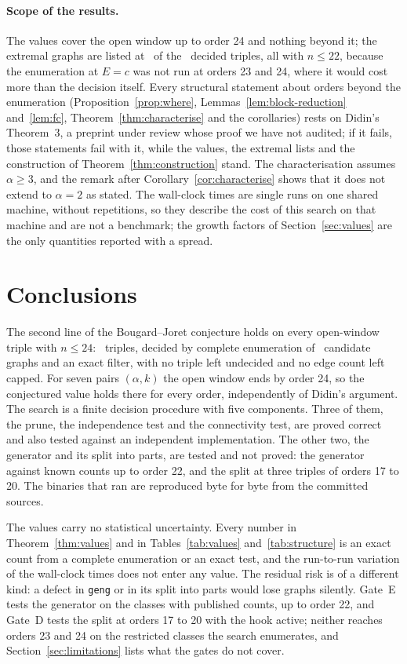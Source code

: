 \documentclass[11pt]{article}
\theoremstyle{definition}
\theoremstyle{remark}
\begin{document}
\paragraph{Scope of the results.} The values cover the open window up to order 24 and nothing beyond it; the
extremal graphs are listed at \nexttriples\ of the \ntriples\ decided triples, all with $n\le22$, because the
enumeration at $E=c$ was not run at orders 23 and 24, where it would cost more than the decision itself. Every
structural statement about orders beyond the enumeration (Proposition~\ref{prop:where}, Lemmas~\ref{lem:block-reduction}
and~\ref{lem:fc}, Theorem~\ref{thm:characterise} and the corollaries) rests on Didin's Theorem~3, a preprint under
review whose proof we have not audited; if it fails, those statements fail with it, while the values, the extremal
lists and the construction of Theorem~\ref{thm:construction} stand. The characterisation assumes $\alpha\ge3$, and the
remark after Corollary~\ref{cor:characterise} shows that it does not extend to $\alpha=2$ as stated. The wall-clock
times are single runs on one shared machine, without repetitions, so they describe the cost of this search on that
machine and are not a benchmark; the growth factors of Section~\ref{sec:values} are the only quantities reported with a
spread.

\section{Conclusions}\label{sec:conclusions}

The second line of the Bougard--Joret conjecture holds on every open-window triple with $n\le24$: \ntriples\
triples, decided by complete enumeration of \ngraphs\ candidate graphs and an exact filter, with no triple left
undecided and no edge count left capped. For seven pairs $(\alpha,k)$ the open window ends by order 24, so the
conjectured value holds there for every order, independently of Didin's argument. The search is a finite decision
procedure with five components. Three of them, the prune, the independence test and the connectivity test, are proved
correct and also tested against an independent implementation. The other two, the generator and its split into parts,
are tested and not proved: the generator against known counts up to order 22, and the split at three triples of orders
17 to 20. The binaries that ran are reproduced byte for byte from the committed sources.

The values carry no statistical uncertainty. Every number in Theorem~\ref{thm:values} and in
Tables~\ref{tab:values} and~\ref{tab:structure} is an exact count from a complete enumeration or an exact test, and
the run-to-run variation of the wall-clock times does not enter any value. The residual risk is of a different kind: a
defect in \texttt{geng} or in its split into parts would lose graphs silently. Gate~E tests the generator on the
classes with published counts, up to order 22, and Gate~D tests the split at orders 17 to 20 with the hook active;
neither reaches orders 23 and 24 on the restricted classes the search enumerates, and Section~\ref{sec:limitations}
lists what the gates do not cover.
\end{document}
